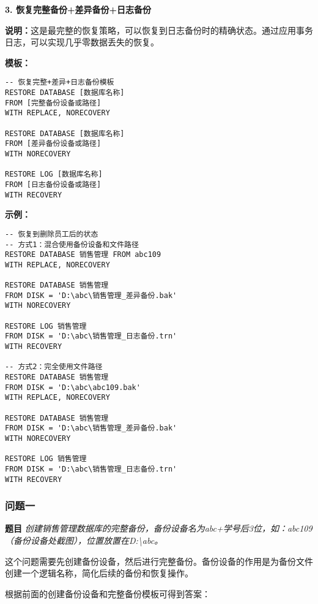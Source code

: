 \textbf{3. 恢复完整备份+差异备份+日志备份}

\qquad \textbf{说明：}这是最完整的恢复策略，可以恢复到日志备份时的精确状态。通过应用事务日志，可以实现几乎零数据丢失的恢复。

\qquad \textbf{模板：}
\begin{mdframed}[backgroundcolor=gray!10]
\begin{verbatim}
-- 恢复完整+差异+日志备份模板
RESTORE DATABASE [数据库名称]
FROM [完整备份设备或路径]
WITH REPLACE, NORECOVERY

RESTORE DATABASE [数据库名称]
FROM [差异备份设备或路径]
WITH NORECOVERY

RESTORE LOG [数据库名称]
FROM [日志备份设备或路径]
WITH RECOVERY
\end{verbatim}
\end{mdframed}

\qquad \textbf{示例：}
\begin{mdframed}[backgroundcolor=blue!5]
\begin{verbatim}
-- 恢复到删除员工后的状态
-- 方式1：混合使用备份设备和文件路径
RESTORE DATABASE 销售管理 FROM abc109
WITH REPLACE, NORECOVERY

RESTORE DATABASE 销售管理
FROM DISK = 'D:\abc\销售管理_差异备份.bak'
WITH NORECOVERY

RESTORE LOG 销售管理
FROM DISK = 'D:\abc\销售管理_日志备份.trn'
WITH RECOVERY

-- 方式2：完全使用文件路径
RESTORE DATABASE 销售管理
FROM DISK = 'D:\abc\abc109.bak'
WITH REPLACE, NORECOVERY

RESTORE DATABASE 销售管理
FROM DISK = 'D:\abc\销售管理_差异备份.bak'
WITH NORECOVERY

RESTORE LOG 销售管理
FROM DISK = 'D:\abc\销售管理_日志备份.trn'
WITH RECOVERY
\end{verbatim}
\end{mdframed}

\subsubsection{问题一}

\textbf{题目} \emph{创建销售管理数据库的完整备份，备份设备名为abc+学号后3位，如：abc109（备份设备处截图），位置放置在D:\textbackslash abc。}

\qquad 这个问题需要先创建备份设备，然后进行完整备份。备份设备的作用是为备份文件创建一个逻辑名称，简化后续的备份和恢复操作。

\qquad 根据前面的创建备份设备和完整备份模板可得到答案：

